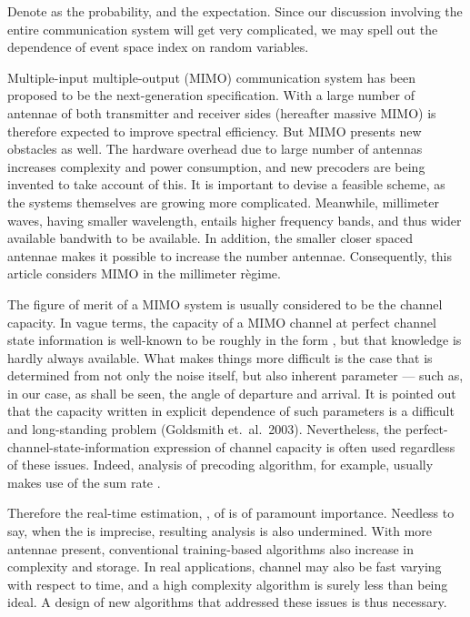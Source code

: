Denote as  the probability, and  the expectation.
Since our discussion involving the entire communication system will get very complicated, we may spell out the dependence of event space index on random variables.

\stopsection
\startsection [title={Background}]

Multiple-input multiple-output (MIMO) communication system has been proposed to be the next-generation specification.
With a large number of antennae of both transmitter and receiver sides (hereafter massive MIMO) is therefore expected to improve spectral efficiency.
But MIMO presents new obstacles as well.
The hardware overhead due to large number of antennas increases complexity and power consumption, and new precoders are being invented to take account of this.
It is important to devise a feasible scheme, as the systems themselves are growing more complicated.
Meanwhile, millimeter waves, having smaller wavelength, entails higher frequency bands, and thus wider available bandwith to be available.
In addition, the smaller closer spaced antennae makes it possible to increase the number antennae.
Consequently, this article considers MIMO in the millimeter r\`egime.

The figure of merit of a MIMO system is usually considered to be the channel capacity.
In vague terms, the capacity  of a MIMO channel  at perfect channel state information is well-known to be roughly in the form , but that knowledge is hardly always available.
What makes things more difficult is the case that  is determined from not only the noise itself, but also inherent parameter --- such as, in our case, as shall be seen, the angle of departure and arrival.
It is pointed out that the capacity written in explicit dependence of such parameters is a difficult and long-standing problem (Goldsmith et.\ al.\ 2003).
Nevertheless, the perfect-channel-state-information expression of channel capacity is often used regardless of these issues.
Indeed, analysis of precoding algorithm, for example, usually makes use of the sum rate .

Therefore the real-time estimation, , of  is of paramount importance.
Needless to say, when the  is imprecise, resulting analysis is also undermined.
With more antennae present, conventional training-based algorithms also increase in complexity and storage.
In real applications, channel may also be fast varying with respect to time, and a high complexity algorithm is surely less than being ideal.
A design of new algorithms that addressed these issues is thus necessary.

